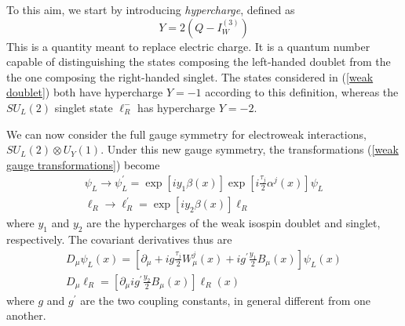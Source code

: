\documentclass[10pt,a4paper]{book}
\begin{document}
To this aim, we start by introducing \emph{hypercharge}, defined as
\begin{equation}
\label{def hypercharge}
Y = 2(Q-I^{(3)}_W)
\end{equation} 
This is a quantity meant to replace electric charge. It is a quantum number capable of distinguishing the states composing the left-handed doublet from the the one composing the right-handed singlet. The states considered in (\ref{weak doublet}) both have hypercharge $Y=-1$ according to this definition, whereas the $SU_L(2)$ singlet state $\ell^-_R$ has hypercharge $Y=-2$. 

We can now consider the full gauge symmetry for electroweak interactions, $SU_L(2) \otimes U_Y(1)$. Under this new gauge symmetry, the transformations (\ref{weak gauge transformations}) become
\begin{gather}
\label{electroweak gauge transformations}
\psi_L \rightarrow \psi_L^\prime = \exp\left[iy_1\beta(x)\right]\exp\left[i\frac{\tau_j}{2} \alpha^j (x)\right]\psi_L \\
\ell_R \rightarrow \ell_R^\prime = \exp\left[iy_2\beta(x)\right]\ell_R
\end{gather}
where $y_1$ and $y_2$ are the hypercharges of the weak isospin doublet and singlet, respectively. The covariant derivatives thus are
\begin{gather}
\label{EW covariant}
D_\mu \psi_L(x) = \left[\partial_\mu + ig\frac{\tau_j}{2}W^j_\mu(x) + ig^\prime \frac{y_1}{2} B_\mu(x) \right]\psi_L(x) \\
D_\mu \ell_R = \left[\partial_\mu ig^\prime \frac{y_2}{2} B_\mu(x)\right]\ell_R(x)
\end{gather}
where $g$ and $g^\prime$ are the two coupling constants, in general different from one another.
\end{document}
